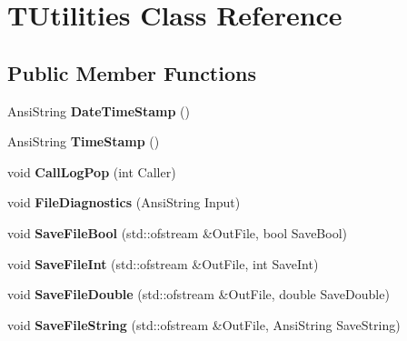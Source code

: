 \hypertarget{class_t_utilities}{}\section{T\+Utilities Class Reference}
\label{class_t_utilities}
\subsection*{Public Member Functions}
\begin{DoxyCompactItemize}
\item 
\mbox{\label{class_t_utilities_a9ca62e05ace8e6c4c33d377c26c48e55}} 
Ansi\+String {\bfseries Date\+Time\+Stamp} ()
\item 
\mbox{\label{class_t_utilities_a34bd6bb5305bc29afdf424f6d35a921c}} 
Ansi\+String {\bfseries Time\+Stamp} ()
\item 
\mbox{\label{class_t_utilities_ae1eddca13cc3c492839e131f40ec21c0}} 
void {\bfseries Call\+Log\+Pop} (int Caller)
\item 
\mbox{\label{class_t_utilities_a100a392ac8eeb3955796954a5afade36}} 
void {\bfseries File\+Diagnostics} (Ansi\+String Input)
\item 
\mbox{\label{class_t_utilities_a06a211ebaa112f3fac0edc5b238ef876}} 
void {\bfseries Save\+File\+Bool} (std\+::ofstream \&Out\+File, bool Save\+Bool)
\item 
\mbox{\label{class_t_utilities_a86ed634e8a9d7ca534a324954f4a7a2f}} 
void {\bfseries Save\+File\+Int} (std\+::ofstream \&Out\+File, int Save\+Int)
\item 
\mbox{\label{class_t_utilities_a92b5adfb8ad3a937a8d208bfd90a5741}} 
void {\bfseries Save\+File\+Double} (std\+::ofstream \&Out\+File, double Save\+Double)
\item 
\mbox{\label{class_t_utilities_a60531c6cb1a6a33dd71299d3a5b6cc21}} 
void {\bfseries Save\+File\+String} (std\+::ofstream \&Out\+File, Ansi\+String Save\+String)
\item 
\mbox{\label{class_t_utilities_a9a0ec4d0c686c71157c371d647824777}} 

\end{DoxyCompactItemize}
